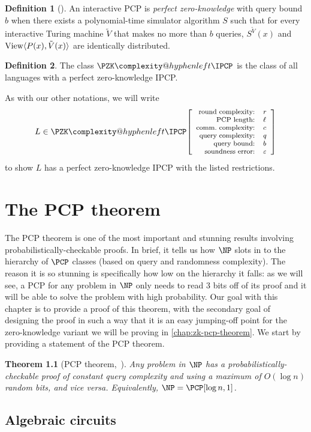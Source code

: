 \documentclass[english,12pt]{reedthesis}
\makeatletter
\theoremstyle{plain}
\newtheorem{thm}{Theorem}[section]
\theoremstyle{definition}
\newtheorem{defn}[defn]{Definition}
\theoremstyle{remark}
\DeclareMathOperator{\View}{View}
\DeclarePairedDelimiter{\ang}{\langle}{\rangle}
\newcommand{\pzkipcp}[6]{%
  \ensuremath%
  \mleft[{\footnotesize\begin{array}{r l}
    \text{round complexity:} & #1 \\
    \text{PCP length:} & #2 \\
    \text{comm.\ complexity:} & #3 \\
    \text{query complexity:} & #4 \\
    \text{query bound:} & #5 \\
    \text{soundness error:} & #6
  \end{array}}\mright]%
}
\newcommand{\PZKIPCP}{%
  \PZK\complexity@hyphenleft\IPCP
}
\makeatother
\begin{document}
\begin{defn}[{\cite[]{CFGS22}}]\label{def:zk-ipcp}
  An interactive PCP is \emph{perfect zero-knowledge} with query bound $b$ when
  there exists a polynomial-time simulator algorithm $S$ such that for every
  interactive Turing machine $\tilde{V}$ that makes no more than $b$ queries,
  $S^{\tilde{V}}(x)$ and $\View\ang{P(x), \tilde{V}(x)}$ are identically
  distributed.
\end{defn}

\begin{defn}\label{def:pzkipcp}\index{PZK-IPCP@$\PZKIPCP$}
  The class $\PZKIPCP$ is the class of all languages with a perfect
  zero-knowledge IPCP\@.
\end{defn}

As with our other notations, we will write
\[
  L \in \PZKIPCP\pzkipcp{r}{\ell}{c}{q}{b}{\varepsilon}
\]
to show $L$ has a perfect zero-knowledge IPCP with the listed restrictions.

\chapter{The PCP theorem}\label{chap:pcp-theorem}

The PCP theorem is one of the most important and stunning results involving
probabilistically-checkable proofs. In brief, it tells us how $\NP$ slots in to
the hierarchy of $\PCP$ classes (based on query and randomness complexity). The
reason it is so stunning is specifically how low on the hierarchy it falls: as
we will see, a PCP for any problem in $\NP$ only needs to read $3$ bits off of
its proof and it will be able to solve the problem with high probability. Our
goal with this chapter is to provide a proof of this theorem, with the secondary
goal of designing the proof in such a way that it is an easy jumping-off point
for the zero-knowledge variant we will be proving in \cref{chap:zk-pcp-theorem}.
We start by providing a statement of the PCP theorem.

\begin{thm}[{PCP theorem,~\cite{AS98}}]\label{thm:pcp-theorem}
  Any problem in $\NP$ has a probabilistically-checkable proof of constant query
  complexity and using a maximum of $O(\log n)$ random bits, and vice versa.
  Equivalently, $\NP = \PCP[\log n, 1]$.
\end{thm}

\section{Algebraic circuits}\label{sec:alg-circuit}
\end{document}
